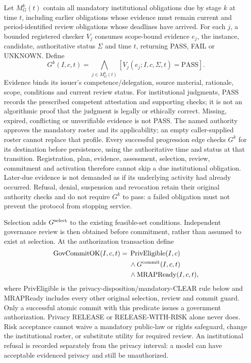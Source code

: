 Let $M_G^k(t)$ contain all mandatory institutional obligations due by stage
$k$ at time $t$, including earlier obligations whose evidence must remain
current and period-identified review obligations whose deadlines have arrived. For each
$j$, a bounded registered checker $V_j$ consumes scope-bound evidence $e_j$,
the instance, candidate, authoritative status $\Sigma$ and time $t$, returning
PASS, FAIL or UNKNOWN. Define
\[
 G^k(I,c,t)=\bigwedge_{j\in M_G^k(t)}
   [V_j(e_j;I,c,\Sigma,t)=\mathrm{PASS}].
\]
Evidence binds its issuer's competence/delegation, source material, rationale,
scope, conditions and current review status. For institutional judgments,
PASS records the prescribed competent attestation and supporting checks;
it is not an algorithmic proof that the judgment is legally or ethically
correct. Missing, expired, conflicting or unverifiable evidence is not PASS.
The named authority approves the mandatory roster and its applicability;
an empty caller-supplied roster cannot replace that profile.
Every successful progression edge checks $G^k$ for its destination before persistence,
using the authoritative time and status at that transition. Registration,
plan, evidence, assessment, selection, review, commitment and activation
therefore cannot skip a due institutional obligation. Later-due evidence
is not demanded as if its underlying activity had already occurred.
Refusal, denial, suspension and revocation retain their original authority
checks and do not require $G^k$ to pass: a failed obligation must not prevent
the protocol from stopping service.

Selection adds $G^{\rm select}$ to the existing feasible-set conditions.
Independent governance review is then obtained before commitment, rather
than assumed to exist at selection. At the authorization transaction define
\[
\begin{aligned}
 \operatorname{GovCommitOK}(I,c,t)={}&\operatorname{PrivEligible}(I,c)\\
 &{}\land G^{\rm commit}(I,c,t)\\
 &{}\land\operatorname{MRAPReady}(I,c,t),
\end{aligned}
\]
where PrivEligible is the privacy-disposition/mandatory-CLEAR rule below and
MRAPReady includes every other original selection, review and commit guard.
Only a successful atomic commit with this predicate issues a government
authorization. Privacy RELEASE or RELEASE-WITH-RISK alone never does.
Risk acceptance cannot waive a mandatory public-law or rights safeguard,
change the institutional roster, or substitute utility for required review.
An institutional refusal is recorded separately from the privacy interval:
a model can have acceptable evidenced privacy and still be unauthorized.

